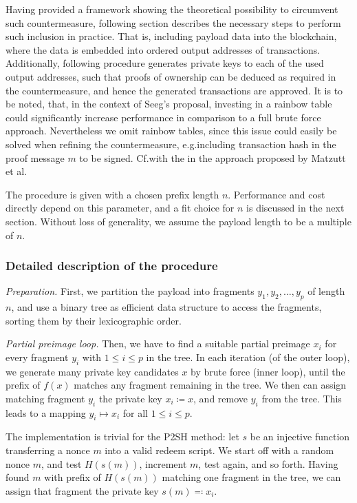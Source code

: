 \documentclass[a4paper,11pt,titlepage]{scrbook}
\begin{document}
Having provided a framework showing the theoretical possibility to circumvent such countermeasure, following section describes the necessary steps to perform such inclusion in practice.
That is, including payload data into the blockchain, where the data is embedded into ordered output addresses of transactions.
Additionally, following procedure generates private keys to each of the used output addresses, such that proofs of ownership can be deduced as required in the countermeasure, and hence the generated transactions are approved.
It is to be noted, that, in the context of Seeg's proposal, investing in a rainbow table could significantly increase performance in comparison to a full brute force approach.
Nevertheless we omit rainbow tables, since this issue could easily be solved when refining the countermeasure, e.g.\@ including transaction hash in the proof message $m$ to be signed.
Cf.\@ with the  in the approach proposed by Matzutt et al. \cite[368--369]{matzutt_thwarting_2018}

The procedure is given with a chosen prefix length $n$. Performance and cost directly depend on this parameter, and a fit choice for $n$ is discussed in the next section.
Without loss of generality, we assume the payload length to be a multiple of $n$.

\subsubsection*{Detailed description of the procedure}

\emph{Preparation.} First, we partition the payload into fragments $y_1, y_2, \dots, y_p$ of length $n$, and use a binary tree as efficient data structure to access the fragments, sorting them by their lexicographic order.

\emph{Partial preimage loop.} 
Then, we have to find a suitable partial preimage $x_i$ for every fragment $y_i$ with $1\leq i \leq p$ in the tree.
In each iteration (of the outer loop), we generate many private key candidates $x$ by brute force (inner loop), until the prefix of $f(x)$ matches any fragment remaining in the tree.
We then can assign matching fragment $y_i$ the private key $x_i \coloneqq x$, and remove $y_i$ from the tree.
This leads to a mapping $y_i \mapsto x_i$ for all $1\leq i\leq p$.

The implementation is trivial for the P2SH method: let $s$ be an injective function transferring a nonce $m$ into a valid redeem script.
We start off with a random nonce $m$, and test $H(s(m))$, increment $m$, test again, and so forth.
Having found $m$ with prefix of $H(s(m))$ matching one fragment in the tree, we can assign that fragment the private key $s(m)\eqqcolon x_i$.
\end{document}
